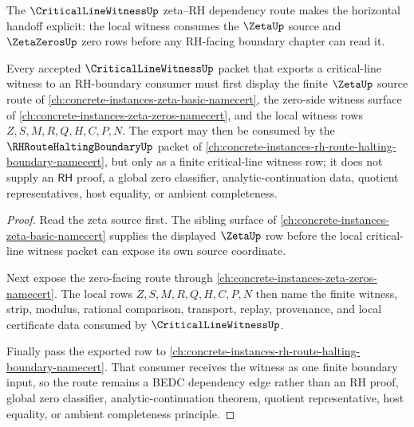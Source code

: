 The $\CriticalLineWitnessUp$ zeta--RH dependency route makes the horizontal handoff explicit: the local witness consumes the $\ZetaUp$ source and $\ZetaZerosUp$ zero rows before any RH-facing boundary chapter can read it.

\begin{theorem}
\label{thm:critical-line-witness-zeta-rh-dependency-route}
Every accepted $\CriticalLineWitnessUp$ packet that exports a critical-line witness to an RH-boundary consumer must first display the finite $\ZetaUp$ source route of \autoref{ch:concrete-instances-zeta-basic-namecert}, the zero-side witness surface of \autoref{ch:concrete-instances-zeta-zeros-namecert}, and the local witness rows $Z,S,M,R,Q,H,C,P,N$. The export may then be consumed by the $\RHRouteHaltingBoundaryUp$ packet of \autoref{ch:concrete-instances-rh-route-halting-boundary-namecert}, but only as a finite critical-line witness row; it does not supply an $\mathsf{RH}$ proof, a global zero classifier, analytic-continuation data, quotient representatives, host equality, or ambient completeness.
\end{theorem}
\begin{proof}
Read the zeta source first. The sibling surface of \autoref{ch:concrete-instances-zeta-basic-namecert} supplies the displayed $\ZetaUp$ row before the local critical-line witness packet can expose its own source coordinate.

Next expose the zero-facing route through \autoref{ch:concrete-instances-zeta-zeros-namecert}. The local rows $Z,S,M,R,Q,H,C,P,N$ then name the finite witness, strip, modulus, rational comparison, transport, replay, provenance, and local certificate data consumed by $\CriticalLineWitnessUp$.

Finally pass the exported row to \autoref{ch:concrete-instances-rh-route-halting-boundary-namecert}. That consumer receives the witness as one finite boundary input, so the route remains a BEDC dependency edge rather than an RH proof, global zero classifier, analytic-continuation theorem, quotient representative, host equality, or ambient completeness principle.
\end{proof}
